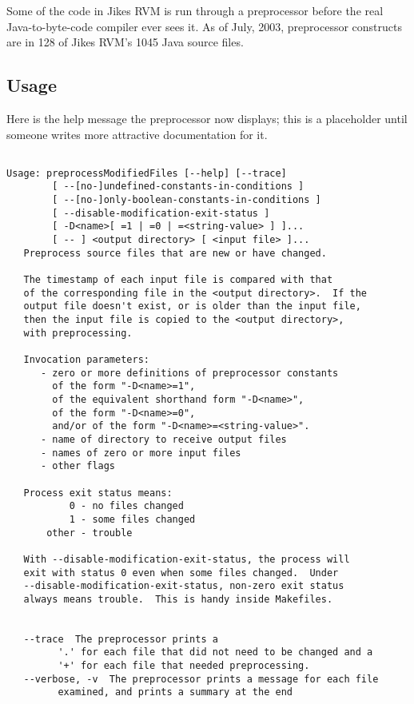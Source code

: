 Some of the code in Jikes\TMweb{} RVM is run through a preprocessor before the
real Java\TMweb-to-byte-code compiler ever sees it.  As of July, 2003, preprocessor
constructs are in 128 of Jikes RVM's 1045 Java source files.

\subsection{Usage}

Here is the help message the preprocessor now displays; this
is a placeholder until someone writes more attractive documentation
for it.

\begin{verbatim}

Usage: preprocessModifiedFiles [--help] [--trace]
        [ --[no-]undefined-constants-in-conditions ]
        [ --[no-]only-boolean-constants-in-conditions ]
        [ --disable-modification-exit-status ]
        [ -D<name>[ =1 | =0 | =<string-value> ] ]...
        [ -- ] <output directory> [ <input file> ]...
   Preprocess source files that are new or have changed.

   The timestamp of each input file is compared with that
   of the corresponding file in the <output directory>.  If the
   output file doesn't exist, or is older than the input file,
   then the input file is copied to the <output directory>, 
   with preprocessing.

   Invocation parameters:
      - zero or more definitions of preprocessor constants
        of the form "-D<name>=1",
        of the equivalent shorthand form "-D<name>", 
        of the form "-D<name>=0",
        and/or of the form "-D<name>=<string-value>".
      - name of directory to receive output files
      - names of zero or more input files
      - other flags

   Process exit status means:
           0 - no files changed
           1 - some files changed
       other - trouble

   With --disable-modification-exit-status, the process will
   exit with status 0 even when some files changed.  Under
   --disable-modification-exit-status, non-zero exit status
   always means trouble.  This is handy inside Makefiles.


   --trace  The preprocessor prints a 
         '.' for each file that did not need to be changed and a 
         '+' for each file that needed preprocessing.
   --verbose, -v  The preprocessor prints a message for each file
         examined, and prints a summary at the end 


\end{verbatim}
